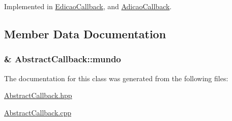 Implemented in \hyperlink{classEdicaoCallback_ab3af9b7362efe5d4a8ec18cf840f66c0}{Edicao\+Callback}, and \hyperlink{classAdicaoCallback_adf5c6d3c487342ea989b7716db834684}{Adicao\+Callback}.



\subsection{Member Data Documentation}
\hypertarget{classAbstractCallback_a17c2460462c7e985368ef227338d3430}{
\subsubsection[{mundo}]{\& Abstract\+Callback\+::mundo\hspace{0.3cm}{\ttfamily [protected]}}}\label{classAbstractCallback_a17c2460462c7e985368ef227338d3430}


The documentation for this class was generated from the following files\+:\begin{DoxyCompactItemize}
\item 
\hyperlink{AbstractCallback_8hpp}{Abstract\+Callback.\+hpp}\item 
\hyperlink{AbstractCallback_8cpp}{Abstract\+Callback.\+cpp}\end{DoxyCompactItemize}
